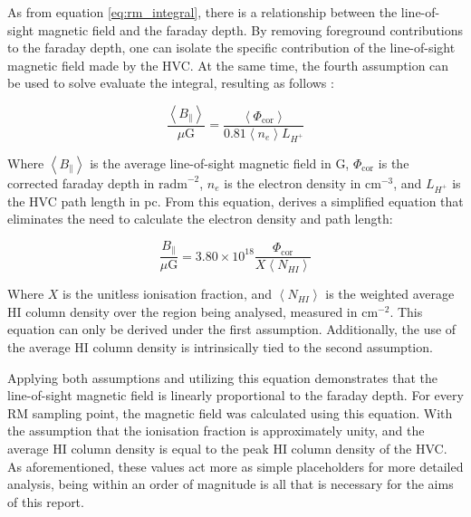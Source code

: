 As from equation \ref{eq:rm_integral}, there is a relationship between the line-of-sight magnetic field and the faraday depth. By removing foreground contributions to the faraday depth, one can isolate the specific contribution of the line-of-sight magnetic field made by the HVC. At the same time, the fourth assumption can be used to solve evaluate the integral, resulting as follows \citep{ID26}:


\begin{equation}
    \frac{\left<B_{\parallel}\right>}{\mu\mathrm{G}}=\frac{\left<\Phi_{\mathrm{cor}}\right>}{0.81\left<n_e\right>L_{H^+}}
\label{eq:B_intermediate}
\end{equation}


Where $\left<B_{\parallel}\right>$ is the average line-of-sight magnetic field in \textmu G, $\Phi_{\mathrm{cor}}$ is the corrected faraday depth in $\mathrm{rad m}^{-2}$, $n_e$ is the electron density in $\mathrm{cm}^{-3}$, and $L_{H^+}$ is the HVC path length in pc. From this equation, \cite{ID27} derives a simplified equation that eliminates the need to calculate the electron density and path length:


\begin{equation}
    \frac{B_{\parallel}}{\mu\mathrm{G}}=3.80\times10^{18}\frac{\Phi_{\mathrm{cor}}}{X\left<N_{HI}\right>}
\label{eq:the_equation}
\end{equation}


Where $X$ is the unitless ionisation fraction, and $\left<N_{HI}\right>$ is the weighted average HI column density over the region being analysed, measured in $\mathrm{cm}^{-2}$. This equation can only be derived under the first assumption. Additionally, the use of the average HI column density is intrinsically tied to the second assumption.


Applying both assumptions and utilizing this equation demonstrates that the line-of-sight magnetic field is linearly proportional to the faraday depth. For every RM sampling point, the magnetic field was calculated using this equation. With the assumption that the ionisation fraction is approximately unity, and the average HI column density is equal to the peak HI column density of the HVC. As aforementioned, these values act more as simple placeholders for more detailed analysis, being within an order of magnitude is all that is necessary for the aims of this report.


